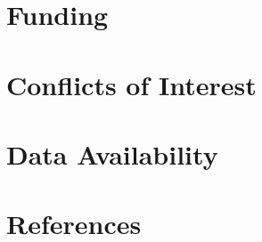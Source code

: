 \documentclass[5p,twocolumn,times]{elsarticle}
\begin{document}
\section*{Funding}


\section*{Conflicts of Interest}


\section*{Data Availability}


\section*{References}

\end{document}
